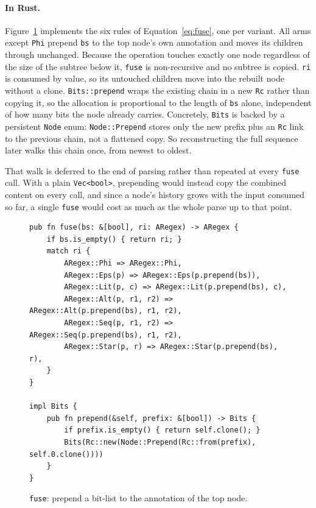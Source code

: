 %

\paragraph{In Rust.}
\label{sec:fuse-impl}

Figure~\ref{fig:fuse-rust} implements the six rules of 
Equation~\eqref{eq:fuse}, one per variant. 
All arms except \texttt{Phi} prepend \texttt{bs} to the top node's own annotation 
and moves its children through unchanged.
Because the operation touches exactly one node 
regardless of the size of the subtree below it, 
\texttt{fuse} is non-recursive and no subtree is copied. 
\texttt{ri} is consumed by value,
so its untouched children move into the rebuilt node without a clone.
\texttt{Bits::prepend} wraps the existing chain 
in a new \texttt{Rc} rather than copying it, 
so the allocation is proportional to the length of \texttt{bs} alone, 
independent of how many bits the node already carries. 
Concretely, \texttt{Bits} is backed by a persistent \texttt{Node} enum:
\texttt{Node::Prepend} stores only the new prefix 
plus an \texttt{Rc} link to the previous chain, 
not a flattened copy. 
So reconstructing the full sequence later walks this chain once,
from newest to oldest. 

That walk is deferred to the end of parsing
rather than repeated at every \texttt{fuse} call.
With a plain \texttt{Vec<bool>}, 
prepending would instead copy the combined content on every call, 
and since a node's history grows with the input consumed so far, 
a single \texttt{fuse} would cost as much as the whole parse up to that point. 
\begin{figure}[H]
\small
\begin{verbatim}
pub fn fuse(bs: &[bool], ri: ARegex) -> ARegex {
    if bs.is_empty() { return ri; }
    match ri {
        ARegex::Phi => ARegex::Phi,
        ARegex::Eps(p) => ARegex::Eps(p.prepend(bs)),
        ARegex::Lit(p, c) => ARegex::Lit(p.prepend(bs), c),
        ARegex::Alt(p, r1, r2) => ARegex::Alt(p.prepend(bs), r1, r2),
        ARegex::Seq(p, r1, r2) => ARegex::Seq(p.prepend(bs), r1, r2),
        ARegex::Star(p, r) => ARegex::Star(p.prepend(bs), r),
    }
}

impl Bits {
    pub fn prepend(&self, prefix: &[bool]) -> Bits {
        if prefix.is_empty() { return self.clone(); }
        Bits(Rc::new(Node::Prepend(Rc::from(prefix), self.0.clone())))
    }
}
\end{verbatim}
\caption{\texttt{fuse}: prepend a bit-list to the annotation of the
top node.}
\label{fig:fuse-rust}
\end{figure}

